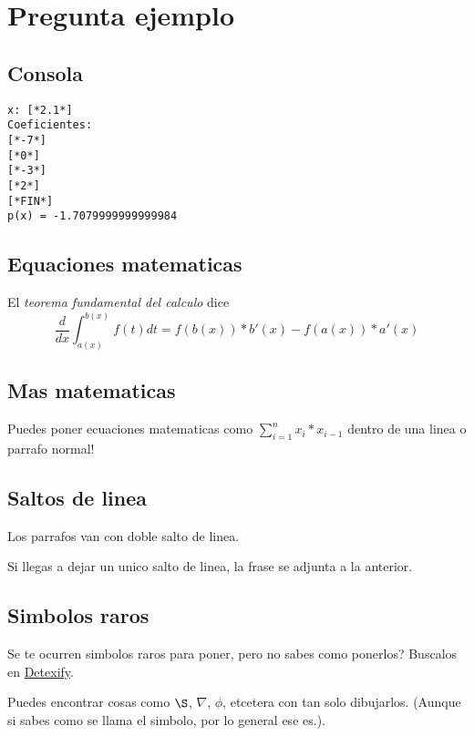 \section{Pregunta ejemplo}

\subsection{Consola}
\begin{lstlisting}[style=consola]
x: [*2.1*]
Coeficientes:
[*-7*]
[*0*]
[*-3*]
[*2*]
[*FIN*]
p(x) = -1.7079999999999984
\end{lstlisting}

\subsection{Equaciones matematicas}

El \textit{teorema fundamental del calculo} dice
\begin{equation*}
	\frac{d}{dx}\int_{a(x)}^{b(x)}{f(t)dt} = f(b(x))*b'(x) - f(a(x))*a'(x)
\end{equation*}

\subsection{Mas matematicas}

Puedes poner ecuaciones matematicas como $\sum_{i=1}^{n}{x_i * x_{i-1}}$ dentro de una linea o parrafo normal!

\subsection{Saltos de linea}

Los parrafos van con doble salto de linea.

Si llegas a dejar un unico salto de linea,
la frase se adjunta a la anterior.

\subsection{Simbolos raros}

Se te ocurren simbolos raros para poner, pero no sabes como ponerlos? Buscalos en \href{http://detexify.kirelabs.org/classify.html}{Detexify}.

Puedes encontrar cosas como $\S$, $\nabla$, $\phi$, etcetera con tan solo dibujarlos. (Aunque si sabes como se llama el simbolo, por lo general ese es.).
